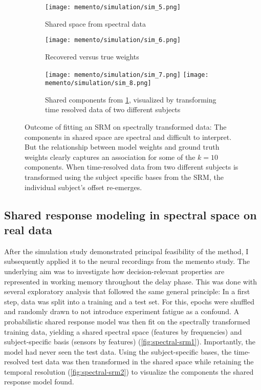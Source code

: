 \begin{figure}
	\begin{subfigure}{.44\textwidth}
		\texttt{[image: memento/simulation/sim\_5.png]}
			\caption{Shared space from spectral data}
		\label{fig:sim-spectral-shared}
	\end{subfigure}
	\begin{subfigure}{0.49\textwidth}
		\texttt{[image: memento/simulation/sim\_6.png]}
			\caption{Recovered versus true weights}
		\label{fig:sim-spectral-weights}
	\end{subfigure}
	\hfill
	\begin{subfigure}{1.\textwidth}
		\texttt{[image: memento/simulation/sim\_7.png]}
		\texttt{[image: memento/simulation/sim\_8.png]}
		\caption{Shared components from \ref{fig:sim-spectral-shared}, visualized by transforming time resolved data of two different subjects}
		\label{fig:sim-spectral-transformed}
	\end{subfigure}
	\caption{Outcome of fitting an \gls{SRM} on spectrally transformed data: The components in shared space are spectral and difficult to interpret. But the relationship between model weights and ground truth weights clearly captures an association for some of the $k=10$ components. When time-resolved data from two different subjects is transformed using the subject specific bases from the \gls{SRM}, the individual subject's offset re-emerges.}
    \label{fig:sim-spectral}
\end{figure}


\subsection{Shared response modeling in spectral space on real data}

After the simulation study demonstrated principal feasibility of the method, I subsequently applied it to the neural recordings from the memento study.
The underlying aim was to investigate how decision-relevant properties are represented in working memory throughout the delay phase.
This was done with several exploratory analysis that followed the same general principle:
In a first step, data was split into a training and a test set.
For this, epochs were shuffled and randomly drawn to not introduce experiment fatigue as a confound.
A probabilistic shared response model was then fit on the spectrally transformed training data, yielding a shared spectral space (features by frequencies) and subject-specific basis (sensors by features) (\ref{fig:spectral-srm1}).
Importantly, the model had never seen the test data.
Using the subject-specific bases, the time-resolved test data was then transformed in the shared space while retaining the temporal resolution (\ref{fig:spectral-srm2}) to visualize the components the shared response model found.





